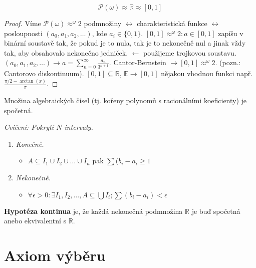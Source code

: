 \begin{thm}
	$$
	\mathcal{P}(\omega) \approx \mathbb{R} \approx [0,1]
	$$
\end{thm}

\begin{proof}
	Víme $\mathcal{P}(\omega) \approx ^{\omega}2$ podmnožiny $\leftrightarrow$ charakteristická funkce $\leftrightarrow$ posloupnosti \newline $(a_{0},a_{1},a_{2},\dots)$, kde $a_{i} \in \{0,1\}$. $[0,1] \approx ^{\omega}2: a \in [0,1]$ zapíšu v binární soustavě tak, že pokud je to nula, tak je to nekonečně nul a jinak vždy tak, aby obsahovalo nekonečno jedniček. $\leftarrow$ použijeme trojkovou soustavu. $(a_{0},a_{1},a_{2},\dots) \to a = \sum_{n = 0}^{\infty} \frac{a_{n}}{3^{n+1}}$. Cantor-Bernstein $\rightarrow [0,1] \approx ^{\omega}2$. (pozn.: Cantorovo diskontinuum). $[0,1] \subseteq \mathbb{R}$, $\mathbb{E} \to [0,1]$ nějakou vhodnou funkci např. $\frac{\pi / 2 - \arctan(x)}{\pi}$.
\end{proof}

\begin{pozn}
	Množina algebraických čísel (tj. kořeny polynomů s racionálními koeficienty) je spočetná.
\end{pozn}

\textit{Cvičení: Pokrytí $N$ intervaly.}

\begin{enumerate}
	\item \textit{Konečně.}
	\begin{itemize}
		\item $A \subseteq I_{1} \cup I_{2} \cup \dots \cup I_{n}$ pak $\sum (b_{i} - a_{i} \geq 1$
	\end{itemize}
	\item \textit{Nekonečně.}
	\begin{itemize}
		\item $\forall \epsilon > 0: \exists I_{1},I_{2}, \dots, A \subseteq \bigcup I_{i}; \sum (b_{i} - a_{i}) < \epsilon$
	\end{itemize}
\end{enumerate}

\begin{pozn}
	\textbf{Hypotéza kontinua} je, že každá nekonečná podmnožina $\mathbb{R}$ je buď spočetná anebo ekvivalentní s $\mathbb{R}$.
\end{pozn}

\section{Axiom výběru}

